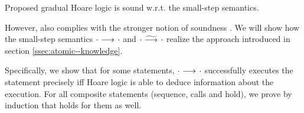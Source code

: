 Proposed gradual Hoare logic is sound w.r.t. the small-step semantics.

However, \gvlidf also complies with the stronger notion of soundness .
We will show how the small-step semantics ${\cdot} \,\,{\longrightarrow^{}}\,\, {\cdot}$ and ${\cdot} \,\,{\widetilde{\longrightarrow}^{}}\,\, {\cdot}$ realize the approach introduced in section \ref{ssec:atomic--knowledge}.

Specifically, we show that for some statements, ${\cdot} \,\,{\longrightarrow^{}}\,\, {\cdot}$ successfully executes the statement precisely iff Hoare logic is able to deduce information about the execution.
For all composite statements (sequence, calls and hold), we prove by induction that  holds for them as well.



